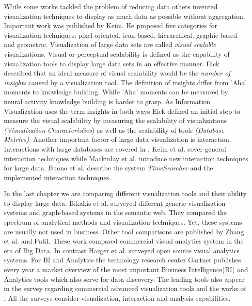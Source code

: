While some works tackled the problem of reducing data others invented visualization techniques to display as much data as possible without aggregation\cite{Krzywinski2009,Luo2012,Fekete2002}. Important work was published by Keim\cite{Keim1996}. He proposed five categories for visualization techniques: pixel-oriented\cite{Keim1995,Stein2013,Keim2000,keim1996pixel,Keim2001, Keim2005,Keim2008VisualChallenges}, icon-based\cite{Chung2014,Borgo2013,Fanea2005}, hierarchical\cite{Yang2003,Shneiderman1992,LeBlanc1990}, graphic-based and geometric\cite{Noirhomme-Fraiture2002}. Visualization of large data sets are called \textit{visual scalable} visualizations. Visual or perceptual scalability is defined as the capability of visualization tools to display large data sets in an effective manner\cite{Eick2002}. Eick described that an ideal measure of visual scalability would be the \textit{number of insights} caused by a visualization tool. The definition of insights differ from 'Aha' moments to knowledge building. While 'Aha' moments can be measured by neural activity knowledge building is harder to grasp. As Information Visualization uses the term insights in both ways Eick defined an initial step to measure the visual scalability by measuring the scalability of visualizations \textit{(Visualization Characteristics}) as well as the scalability of tools \textit{(Database Metrics)}. 
Another important factor of large data visualization is interaction. Interactions with large databases are covered in \cite{Buono,Jerding1998,mackinlay1991perspective,Keim2005}. Keim et al.\cite{Keim2005} cover general interaction techniques while Mackinlay et al. introduce new interaction techniques for large data\cite{mackinlay1991perspective}. Buono et al. describe the system \textit{TimeSearcher} and the implemented interaction techniques\cite{Buono}.
\par
In the last chapter we are comparing different visualization tools and their ability to display large data.  Bikakis et al. surveyed different generic visualization systems and graph-based systems in the semantic web\cite{Bikakis2016}. They compared the spectrum of analytical methods and visualization techniques. Yet, these systems are usually not used in business. 
Other tool comparisons are published by Zhang et al.\cite{Zhanga} and Patil\cite{Patil}. These work compared commercial visual analytics system in the era of Big Data. In contrast Harger et al. surveyed open source visual analytics systems\cite{Harger}. For BI and Analytics the technology research center Gartner publishes every year a market overview of the most important Business Intelligence(BI) and Analytics tools which also serve for data discovery. The leading tools also appear in the survey\cite{Evelson2012} regarding commercial advanced visualization tools and the works of \cite{Zhanga}. All the surveys consider visualization, interaction and analysis capabilities.  
